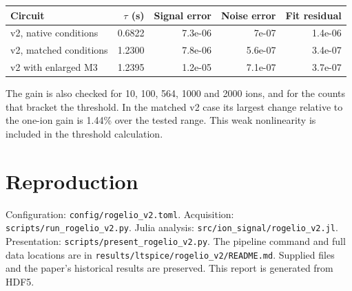 \documentclass[11pt,a4paper]{article}
\begin{document}
\begin{center}\small\begin{tabular}{lrrrr}\toprule
Circuit & $\tau$ (s) & Signal error & Noise error & Fit residual\\\midrule
v2, native conditions & 0.6822 & 7.3e-06 & 7e-07 & 1.4e-06 \\
v2, matched conditions & 1.2300 & 7.8e-06 & 5.6e-07 & 3.4e-07 \\
v2 with enlarged M3 & 1.2395 & 1.2e-05 & 7.1e-07 & 3.7e-07 \\
\bottomrule\end{tabular}\end{center}
The gain is also checked for 10, 100, 564, 1000 and 2000 ions, and for the
counts that bracket the threshold. In the matched v2 case its largest change
relative to the one-ion gain is 1.44\% over the tested range.
This weak nonlinearity is included in the threshold calculation.

\section*{Reproduction}
Configuration: \texttt{config/rogelio\_v2.toml}. Acquisition:
\texttt{scripts/run\_rogelio\_v2.py}. Julia analysis:
\texttt{src/ion\_signal/rogelio\_v2.jl}. Presentation:
\texttt{scripts/present\_rogelio\_v2.py}.
The pipeline command and full data locations are in
\texttt{results/ltspice/rogelio\_v2/README.md}. Supplied files and the
paper's historical results are preserved. This report is generated from HDF5.
\end{document}

